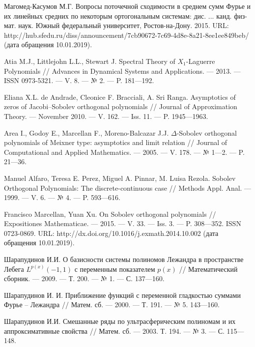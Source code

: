 \begin{thebibliography}{111}
Магомед-Касумов М.Г. Вопросы поточечной сходимости в среднем сумм Фурье и их линейных средних по некоторым ортогональным системам: дис. ... канд. физ-мат. наук. Южный федеральный университет, Ростов-на-Дону. 2015. URL: http://hub.sfedu.ru/diss/announcement/7cb90672-7c69-4d8e-8a21-8ee1ee849beb/ (дата обращения 10.01.2019).


Atia M.J., Littlejohn L.L., Stewart J. Spectral Theory of $X_1$-Laguerre Polynomials // Advances in Dynamical Systems and Applications. --- 2013. --- ISSN 0973-5321. --- V. 8. --- № 2. --- P. 181---192.




Eliana X.L. de Andrade, Cleonice F. Bracciali, A. Sri Ranga. Asymptotics of zeros of Jacobi–Sobolev orthogonal polynomials // Journal of Approximation Theory. --- November 2010. --- V. 162. --- Iss. 11. --- P. 1945---1963.




Area I., Godoy E., Marcellan F., Moreno-Balcazar J.J. $\Delta$-Sobolev orthogonal polynomials of Meixner type: asymptotics and limit relation // Journal of Computational and Applied Mathematics. --- 2005. --- V. 178. --- № 1---2. --- P. 21---36.




Manuel Alfaro, Teresa E. Perez, Miguel A. Pinnar, M. Luisa Rezola. Sobolev Orthogonal Polynomials: The discrete-continuous case // Methods Appl. Anal. --- 1999. --- V. 6. --- № 4. --- P. 593---616.




Francisco Marcellan, Yuan Xu. On Sobolev orthogonal polynomials // Expositiones Mathematicae. --- 2015. --- V. 33. --- Iss. 3. --- P. 308---352. ISSN 0723-0869. URL: http://dx.doi.org/10.1016/j.exmath.2014.10.002 (дата обращения 10.01.2019).

Шарапудинов И.И. О базисности системы полиномов Лежандра в пространстве Лебега $L^{p(x)}(-1,1)$ с переменным показателем $p(x)$ // Математический сборник. --- 2009. --- Т. 200. --- № 1. --- С. 137---160.

Шарапудинов И. И. Приближение функций с переменной гладкостью суммами Фурье -- Лежандра // Матем. сб. --- 2000. --- Т. 191. --- № 5. 143---160.




Шарапудинов И.И. Смешанные ряды по ультрасферическим полиномам и их аппроксимативные свойства // Матем. сб. --- 2003. Т. 194. --- № 3. --- С. 115---148.





\end{thebibliography}
